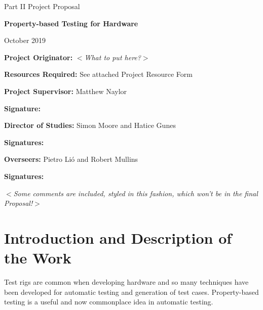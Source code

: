 \documentclass[UKenglish, 12pt]{article}
\newcommand{\al}{$<$}
\newcommand{\ar}{$>$}
\begin{document}
\thispagestyle{empty}

\medskip
{}
\medskip
{}

\vfil

\centerline{\large Part II Project Proposal}
\vspace{0.4in}
\centerline{\Large\bf Property-based Testing for Hardware}
\vspace{0.3in}
\centerline{\large{October 2019}}

\vfil

{\bf Project Originator:} \al\emph{What to put here?}\ar

\vspace{0.1in}

{\bf Resources Required:} See attached Project Resource Form

\vspace{0.5in}

{\bf Project Supervisor:} {Matthew Naylor}

\vspace{0.2in}

{\bf Signature:}

\vspace{0.5in}

{\bf Director of Studies:} {Simon Moore and Hatice Gunes}

\vspace{0.2in}

{\bf Signatures:}

\vspace{0.5in}

{\bf Overseers:} {Pietro Li\'o} and {Robert Mullins}

\vspace{0.2in}

{\bf Signatures:}

\vfil
\eject


\al\emph{Some comments are included, styled in this fashion, which
won't be in the final Proposal!}\ar

\section*{Introduction and Description of the Work}

Test rigs are common when developing hardware and so many techniques have
been developed for automatic testing and generation of test cases. Property-based
testing is a useful and now commonplace idea in automatic testing.
\end{document}
